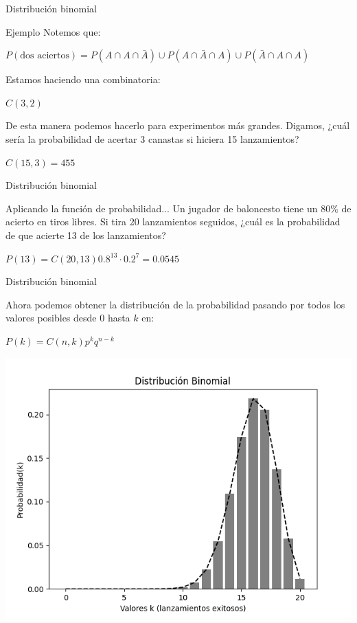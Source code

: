 \documentclass{beamer}
\begin{document}
\begin{frame}{Distribución binomial}
  \begin{block}{Ejemplo}
    Notemos que:

    $P(\text{dos aciertos}) = P(A \cap A \cap \bar{A}) 
                          \cup P(A \cap \bar{A} \cap A)
                          \cup P(\bar{A} \cap A \cap A )$
                          
    Estamos haciendo una combinatoria:

    $C(3,2)$

  \end{block}

  \begin{block}{}
    De esta manera podemos hacerlo para experimentos más grandes. Digamos, ¿cuál
    sería la probabilidad de acertar 3 canastas si hiciera 15 lanzamientos?

    $C(15,3) = 455$
  \end{block}
\end{frame}

\begin{frame}{Distribución binomial}
  \begin{block}{Aplicando la función de probabilidad...}
      Un jugador de baloncesto tiene un 80\% de acierto en tiros libres. Si tira 20
      lanzamientos seguidos, ¿cuál es la probabilidad de que acierte 13 de los
      lanzamientos?
      
    $P(13) = C(20,13) 0.8^{13} \cdot 0.2^{7} = 0.0545$
  \end{block}
\end{frame}

\begin{frame}{Distribución binomial}
  \begin{block}{}
Ahora podemos obtener la distribución de la probabilidad pasando por todos los
valores posibles desde 0 hasta $k$ en:

    $P(k) = C(n,k) p^k q^{n-k}$
  \end{block}

  \begin{center}
  \includegraphics[scale=0.5]{figures/binomial_distribution.png}
  \end{center}
\end{frame}
\end{document}

